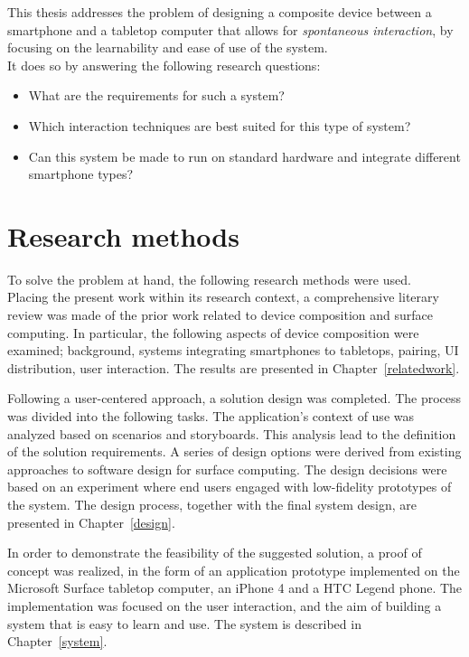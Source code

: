 This thesis addresses the problem of 
designing a composite device between a smartphone and a tabletop computer that allows for \emph{spontaneous interaction}, by focusing on the learnability and ease of use of the system.
\\
\linebreak
It does so by answering the following research questions:
\begin{itemize}
\item What are the requirements for such a system?
\item Which interaction techniques are best suited for this type of system?
\item Can this system be made to run on standard hardware and integrate different smartphone types?
\end{itemize}

\section{Research methods}

To solve the problem at hand, the following research methods were used.
\\
\linebreak
Placing the present work within its research context, 
a comprehensive literary review was made of the prior work related to device composition and surface computing.
In particular, the following aspects of device composition were examined; background, systems integrating smartphones to tabletops, pairing, UI distribution, user interaction.
The results are presented in Chapter~\ref{relatedwork}.

Following a user-centered approach, a solution design was completed.
The process was divided into the following tasks.
The application's context of use was analyzed based on scenarios and storyboards.
This analysis lead to the definition of the solution requirements.
A series of design options were derived from existing approaches to software design for surface computing.
The design decisions were based on an experiment where end users engaged with low-fidelity prototypes of the system.
The design process, together with the final system design, are presented in Chapter~\ref{design}.

In order to demonstrate the feasibility of the suggested solution, a proof of concept was realized, in the form of an application prototype implemented on the Microsoft Surface tabletop computer, an iPhone 4 and a HTC Legend phone.
The implementation was focused on the user interaction, and the aim of building a system that is easy to learn and use.
The system is described in Chapter~\ref{system}.

